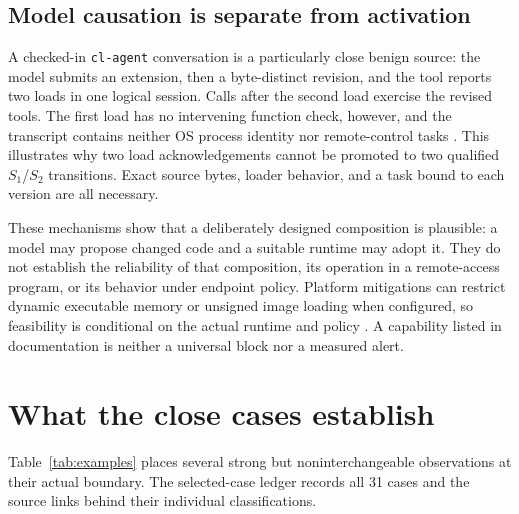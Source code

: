\documentclass[11pt,letterpaper]{article}
\begin{document}
\subsection{Model causation is separate from activation}

A checked-in \texttt{cl-agent} conversation is a particularly close benign source: the model submits an extension, then a byte-distinct revision, and the tool reports two loads in one logical session. Calls after the second load exercise the revised tools. The first load has no intervening function check, however, and the transcript contains neither OS process identity nor remote-control tasks \cite{clagent}. This illustrates why two load acknowledgements cannot be promoted to two qualified $S_1$/$S_2$ transitions. Exact source bytes, loader behavior, and a task bound to each version are all necessary.

These mechanisms show that a deliberately designed composition is plausible: a model may propose changed code and a suitable runtime may adopt it. They do not establish the reliability of that composition, its operation in a remote-access program, or its behavior under endpoint policy. Platform mitigations can restrict dynamic executable memory or unsigned image loading when configured, so feasibility is conditional on the actual runtime and policy \cite{msmitigations,applehardened,systemdexec}. A capability listed in documentation is neither a universal block nor a measured alert.

\section{What the close cases establish}\label{sec:cases}

Table~\ref{tab:examples} places several strong but noninterchangeable observations at their actual boundary. The selected-case ledger records all 31 cases and the source links behind their individual classifications.
\end{document}
